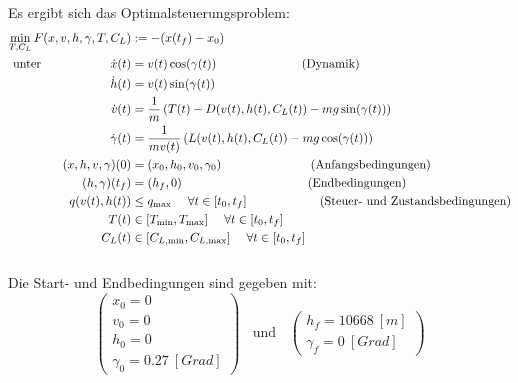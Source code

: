 Es ergibt sich das Optimalsteuerungsproblem:
\[\begin{split}
\min_{T, C_L} F(x,v,h,\gamma,T,C_L) &:= -(x(t_f) - x_0) \\\
\text{unter}  \hspace{20mm} \dot{x}(t) &= v(t) \cos(\gamma(t)) \ \qquad \qquad \qquad  \ \ \text{(Dynamik)}\\\
\dot{h}(t) &= v(t) \sin(\gamma(t)) \\\
\dot{v}(t) &= \dfrac{1}{m} \left( T(t) - D(v(t),h(t),C_L(t)) - mg \sin(\gamma(t)) \right) \\\
\dot{\gamma}(t) &=  \dfrac{1}{mv(t)} \left( L(v(t),h(t),C_L(t)) - mg \cos(\gamma(t)) \right) \\\
%
(x,h,v,\gamma)(0) &= (x_0,h_0,v_0,\gamma_0) \qquad \qquad \qquad \ \ \ \ \text{(Anfangsbedingungen)}\\\
(h,\gamma)(t_f) &= (h_f,0) \qquad \qquad \qquad \qquad \qquad  \  \text{(Endbedingungen)}\\\
%
q(v(t),h(t)) &\leq q_{\max} \ \ \ \ \forall t \in [t_0,t_f] \qquad \qquad  \ \ \ \ \ \ \text{(Steuer- und Zustandsbedingungen)}\\\
T(t) &\in [T_{\min},T_{\max}] \ \ \ \ \forall t \in [t_0,t_f] \\\
C_L(t) &\in [C_{L, \min},C_{L, \max}] \ \ \ \ \forall t \in [t_0,t_f] \\\
\end{split} \]
Die Start- und Endbedingungen sind gegeben mit:
\begin{equation}
\begin{pmatrix}
x_0 = 0 \\ 
v_0 = 0 \\ 
h_0 = 0 \\ 
\gamma_0 = 0.27 \ [Grad]
\end{pmatrix} \ \ \ \ \text{und} \ \ \ \ \begin{pmatrix}
h_f = 10668 \ [m] \\ 
\gamma_f = 0 \ [Grad]
\end{pmatrix}  
\end{equation}









